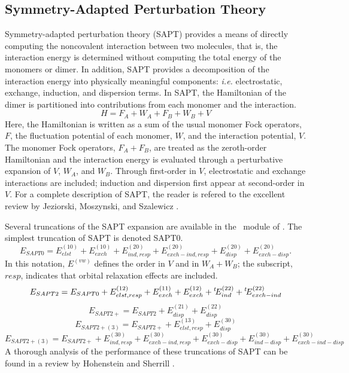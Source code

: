 \subsection{Symmetry-Adapted Perturbation Theory} \label{sapt}

Symmetry-adapted perturbation theory (SAPT) provides a means of directly
computing the noncovalent interaction between two molecules, that is, the
interaction energy is determined without computing the total energy of the
monomers or dimer. In addition, SAPT provides a decomposition of the
interaction energy into physically meaningful components: {\em i.e.}
electrostatic, exchange, induction, and dispersion terms. In SAPT, the 
Hamiltonian of the dimer is partitioned into contributions from each 
monomer and the interaction.
\begin{equation}
H=F_A+W_A+F_B+W_B+V
\end{equation}
Here, the Hamiltonian is written as a sum of the usual monomer Fock
operators, $F$, the fluctuation potential of each monomer, $W$, and the
interaction potential, $V$. The monomer Fock operators, $F_A+F_B$, are
treated as the zeroth-order Hamiltonian and the interaction energy is
evaluated through a perturbative expansion of $V$, $W_A$, and $W_B$. 
Through first-order in $V$, electrostatic and exchange interactions are
included; induction and dispersion first appear at second-order in $V$. For
a complete description of SAPT, the reader is refered to the excellent
review by Jeziorski, Moszynski, and Szalewicz \cite{Jeziorski:1994:1887}.

Several truncations of the SAPT expansion are available in the \PSIsapt\
module of \PSIfour. The simplest truncation of SAPT is denoted SAPT0.
\begin{equation}
\label{eqn:SAPT0}
E_{SAPT0} = E_{elst}^{(10)} + E_{exch}^{(10)} + E_{ind,resp}^{(20)} +
E_{exch-ind,resp}^{(20)} + E_{disp}^{(20)} + E_{exch-disp}^{(20)}.
\end{equation}
In this notation, $E^{(vw)}$ defines the order in $V$ and in $W_A+W_B$; the
subscript, $resp$, indicates that orbital relaxation effects are included.
\begin{equation}
\label{eqn:SAPT2}
E_{SAPT2} = E_{SAPT0} + E_{elst,resp}^{(12)} + E_{exch}^{(11)} +
E_{exch}^{(12)} +\/ ^{t}\!E_{ind}^{(22)} +\/ ^{t}\!E_{exch-ind}^{(22)}
\end{equation}
\begin{equation}
\label{eqn:SAPT2+}
E_{SAPT2+} = E_{SAPT2} + E_{disp}^{(21)} + E_{disp}^{(22)}
\end{equation}
\begin{equation}
\label{eqn:SAPT2+p3}
E_{SAPT2+(3)} = E_{SAPT2+} + E_{elst,resp}^{(13)} + E_{disp}^{(30)}
\end{equation}
\begin{equation}
\label{eqn:SAPT2+3}
E_{SAPT2+(3)} = E_{SAPT2+} + E_{ind,resp}^{(30)} + E_{exch-ind,resp}^{(30)}
+ E_{exch-disp}^{(30)} + E_{ind-disp}^{(30)} + E_{exch-ind-disp}^{(30)}
\end{equation}
A thorough analysis of the performance of these truncations of SAPT can be
found in a review by Hohenstein and Sherrill \cite{Hohenstein:2012:WIREs}.


